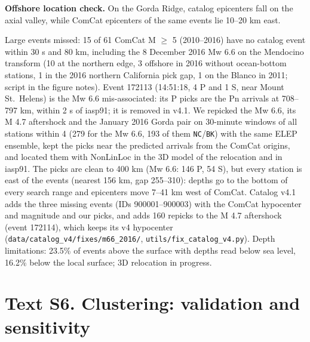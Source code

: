 \documentclass[11pt]{article}
\begin{document}
\textbf{Offshore location check.} On the Gorda Ridge, catalog epicenters
fall on the axial valley, while ComCat epicenters of the same events lie
10--20 km east.

Large events missed: 15 of 61 ComCat M \ensuremath{\geq} 5 (2010--2016) have no catalog
event within 30 s and 80 km, including the 8 December 2016 Mw 6.6 on the
Mendocino transform (10 at the northern edge, 3 offshore in 2016 without
ocean-bottom stations, 1 in the 2016 northern California pick gap, 1 on
the Blanco in 2011; script in the figure notes). Event 172113 (14:51:18,
4 P and 1 S, near Mount St.~Helens) is the Mw 6.6 mis-associated: its P
picks are the Pn arrivals at 708--797 km, within 2 s of iasp91; it is
removed in v4.1. We repicked the Mw 6.6, its M 4.7 aftershock and the
January 2016 Gorda pair on 30-minute windows of all stations within 4\textdegree{}
(279 for the Mw 6.6, 193 of them \texttt{NC}/\texttt{BK}) with the same
ELEP ensemble, kept the picks near the predicted arrivals from the
ComCat origins, and located them with NonLinLoc in the 3D model of the
relocation and in iasp91. The picks are clean to 400 km (Mw 6.6: 146 P,
54 S), but every station is east of the events (nearest 156 km, gap
255--310\textdegree{}): depths go to the bottom of every search range and epicenters
move 7--41 km west of ComCat. Catalog v4.1 adds the three missing events
(IDs 900001--900003) with the ComCat hypocenter and magnitude and our
picks, and adds 160 repicks to the M 4.7 aftershock (event 172114),
which keeps its v4 hypocenter
(\texttt{data/catalog\_v4/fixes/m66\_2016/},
\texttt{utils/fix\_catalog\_v4.py}). Depth limitations: 23.5\% of events
above the surface with depths read below sea level, 16.2\% below the
local surface; 3D relocation in progress.

\section{Text S6. Clustering: validation and
sensitivity}\label{text-s6.-clustering-validation-and-sensitivity}
\end{document}
